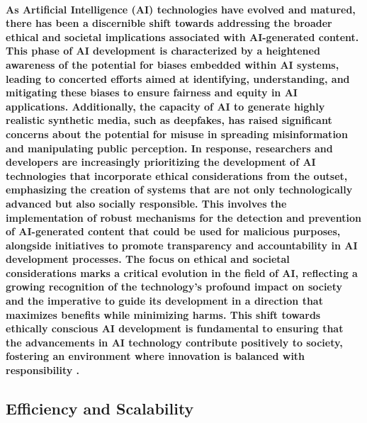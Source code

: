\documentclass[11pt,a4paper,oneside]{report}
\begin{document}
\paragraph{As Artificial Intelligence (AI) technologies have evolved and matured, there has been a discernible shift towards addressing the broader ethical and societal implications associated with AI-generated content. This phase of AI development is characterized by a heightened awareness of the potential for biases embedded within AI systems, leading to concerted efforts aimed at identifying, understanding, and mitigating these biases to ensure fairness and equity in AI applications. Additionally, the capacity of AI to generate highly realistic synthetic media, such as deepfakes, has raised significant concerns about the potential for misuse in spreading misinformation and manipulating public perception. In response, researchers and developers are increasingly prioritizing the development of AI technologies that incorporate ethical considerations from the outset, emphasizing the creation of systems that are not only technologically advanced but also socially responsible. This involves the implementation of robust mechanisms for the detection and prevention of AI-generated content that could be used for malicious purposes, alongside initiatives to promote transparency and accountability in AI development processes. The focus on ethical and societal considerations marks a critical evolution in the field of AI, reflecting a growing recognition of the technology's profound impact on society and the imperative to guide its development in a direction that maximizes benefits while minimizing harms. This shift towards ethically conscious AI development is fundamental to ensuring that the advancements in AI technology contribute positively to society, fostering an environment where innovation is balanced with responsibility \cite{esposito2023mitigating}.}

\subsection{Efficiency and Scalability}
\end{document}
